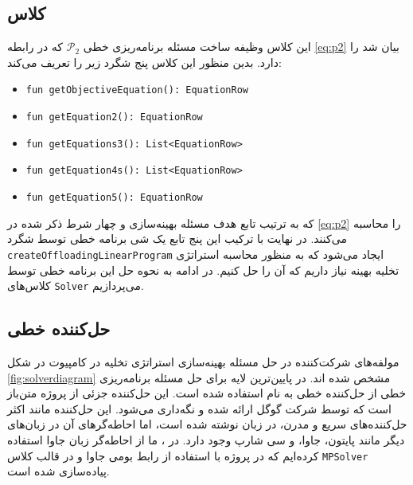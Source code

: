 \subsection{کلاس }
این کلاس وظیفه ساخت مسئله برنامه‌ریزی خطی
$\mathcal{P}_2$
که در رابطه \ref{eq:p2} بیان شد را دارد. بدین منظور این کلاس پنج شگرد زیر را تعریف می‌کند:
\begin{latin}
	\begin{itemize}
		\item \texttt{\footnotesize fun getObjectiveEquation(): EquationRow}
		\item \texttt{\footnotesize fun getEquation2(): EquationRow}
		\item \texttt{\footnotesize fun getEquations3(): List<EquationRow>}
		\item \texttt{\footnotesize fun getEquation4s(): List<EquationRow>}
		\item \texttt{\footnotesize fun getEquation5(): EquationRow}
	\end{itemize}
\end{latin}
که به ترتیب تابع هدف مسئله بهینه‌سازی و چهار شرط ذکر شده در \ref{eq:p2} را محاسبه می‌کنند. در نهایت با ترکیب این پنج تابع یک شی برنامه خطی توسط شگرد \texttt{\footnotesize createOffloadingLinearProgram} ایجاد می‌شود که به منظور محاسبه استراتژی تخلیه بهینه نیاز داریم که آن را حل کنیم. در ادامه به نحوه حل این برنامه خطی توسط کلاس‌های \texttt{\footnotesize Solver} می‌پردازیم.
\subsection{حل‌کننده خطی}
مولفه‌های شرکت‌کننده در حل مسئله بهینه‌سازی استراتژی تخلیه در کامپیوت در شکل \ref{fig:solverdiagram} مشخص شده اند. در پایین‌ترین لایه برای حل مسئله برنامه‌ریزی خطی از حل‌کننده خطی  به نام  استفاده شده است. این حل‌کننده جزئی از پروژه متن‌باز  است که توسط شرکت گوگل ارائه شده و نگه‌داری می‌شود. \cite{glop} این حل‌کننده مانند اکثر حل‌کننده‌های سریع و مدرن، در زبان  نوشته شده است، اما احاطه‌گرهای آن در زبان‌های دیگر مانند پایتون، جاوا، و سی شارپ وجود دارد. در \CurrentProject، ما از احاطه‌گر زبان جاوا استفاده کرده‌ایم که در پروژه  با استفاده از رابط بومی جاوا و در قالب کلاس \texttt{\footnotesize MPSolver} پیاده‌سازی شده است. \\

